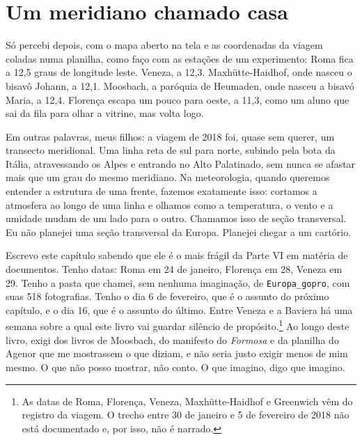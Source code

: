 \documentclass[
  brazilian,
  11pt,
  openany]{book}
\begin{document}
\section{Um meridiano chamado casa}\label{um-meridiano-chamado-casa}

Só percebi depois, com o mapa aberto na tela e as coordenadas da viagem
coladas numa planilha, como faço com as estações de um experimento: Roma
fica a 12,5 graus de longitude leste. Veneza, a 12,3. Maxhütte-Haidhof,
onde nasceu o bisavô Johann, a 12,1. Moosbach, a paróquia de Heumaden,
onde nasceu a bisavó Maria, a 12,4. Florença escapa um pouco para oeste,
a 11,3, como um aluno que sai da fila para olhar a vitrine, mas volta
logo.

Em outras palavras, meus filhos: a viagem de 2018 foi, quase sem querer,
um transecto meridional. Uma linha reta de sul para norte, subindo pela
bota da Itália, atravessando os Alpes e entrando no Alto Palatinado, sem
nunca se afastar mais que um grau do mesmo meridiano. Na meteorologia,
quando queremos entender a estrutura de uma frente, fazemos exatamente
isso: cortamos a atmosfera ao longo de uma linha e olhamos como a
temperatura, o vento e a umidade mudam de um lado para o outro. Chamamos
isso de seção transversal. Eu não planejei uma seção transversal da
Europa. Planejei chegar a um cartório.

Escrevo este capítulo sabendo que ele é o mais frágil da Parte VI em
matéria de documentos. Tenho datas: Roma em 24 de janeiro, Florença em
28, Veneza em 29. Tenho a pasta que chamei, sem nenhuma imaginação, de
\texttt{Europa\_gopro}, com suas 518 fotografias. Tenho o dia 6 de
fevereiro, que é o assunto do próximo capítulo, e o dia 16, que é o
assunto do último. Entre Veneza e a Baviera há uma semana sobre a qual
este livro vai guardar silêncio de propósito.\footnote{As datas de Roma,
  Florença, Veneza, Maxhütte-Haidhof e Greenwich vêm do registro da
  viagem. O trecho entre 30 de janeiro e 5 de fevereiro de 2018 não está
  documentado e, por isso, não é narrado.} Ao longo deste livro, exigi
dos livros de Moosbach, do manifesto do \emph{Formosa} e da planilha do
Agenor que me mostrassem o que diziam, e não seria justo exigir menos de
mim mesmo. O que não posso mostrar, não conto. O que imagino, digo que
imagino.
\end{document}
